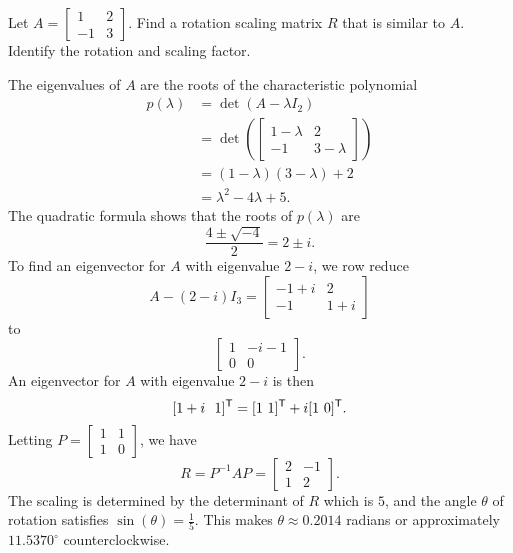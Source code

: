 \begin{example} Let $A = \left[ \begin{array}{rc} 1&2\\-1&3 \end{array} \right]$.  Find a rotation scaling matrix $R$ that is similar to $A$. Identify the rotation and scaling factor.


\ExampleSolution
The eigenvalues of $A$ are the roots of the characteristic polynomial
\begin{align*}
p(\lambda) &= \det(A - \lambda I_2) \\
	&= \det\left(\left[ \begin{array}{rc} 1-\lambda&2\\-1&3-\lambda \end{array} \right]\right) \\
	&= (1-\lambda)(3-\lambda) + 2 \\
	&= \lambda^2 -4\lambda + 5.
\end{align*}
The quadratic formula shows that the roots of $p(\lambda)$ are 
\[\frac{4 \pm \sqrt{-4}}{2} = 2 \pm i.\]
To find an eigenvector for $A$ with eigenvalue $2-i$, we row reduce 
\[A - (2-i) I_3 =   \left[ \begin{array}{cc} -1+i&2\\-1&1+i \end{array} \right]\]
to 
\[\left[ \begin{array}{cc} 1&-i-1\\0&0 \end{array} \right].\]
An eigenvector for $A$ with eigenvalue $2-i$ is then 
\[[ 1+i \  \ 1]^{\mathsf{T}} = [1 \ 1]^{\mathsf{T}} + i[1 \ 0]^{\mathsf{T}}.\]
Letting $P = \left[  \begin{array}{cc} 1&1\\1&0 \end{array} \right]$, we have 
\[R = P^{-1}AP = \left[ \begin{array}{cr} 2&-1\\1&2 \end{array} \right].\]
The scaling is determined by the determinant of $R$ which is $5$, and the angle $\theta$ of rotation satisfies $\sin(\theta) = \frac{1}{5}$. This makes  $\theta \approx 0.2014$ radians or approximately $11.5370^{\circ}$ counterclockwise. 


\end{example}



\label{sec:comp_eigen_summ}

